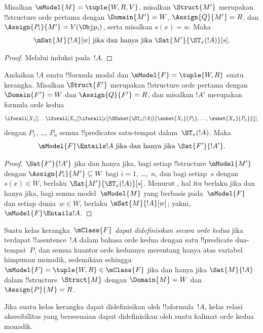 \documentclass[../../../include/open-logic-section]{subfiles}
\begin{document}
\begin{prop}
  Misalkan $\mModel{M}=\tuple{W,R,V}$, misalkan $\Struct{M'}$ merupakan
  !!{structure} orde pertama dengan $\Domain{M'}=W$,
  $\Assign{Q}{M'}=R$, dan $\Assign{P_i}{M'}=V(\Obj p_i)$, serta misalkan
  $s(x)=w$. Maka
  \[
  \mSat{M}{!A}[w] \text{ jika dan hanya jika } \Sat{M'}{\ST_x(!A)}[s].
  \]
\end{prop}

\begin{proof}
  Melalui induksi pada~$!A$.
\end{proof}

\begin{prop}
  Andaikan $!A$ suatu !!{formula} modal dan
  $\mModel{F}=\tuple{W,R}$ suatu kerangka. Misalkan $\Struct{F'}$ merupakan
  !!{structure} orde pertama dengan $\Domain{F'}=W$ dan
  $\Assign{Q}{F'}=R$, dan misalkan $!A'$ merupakan formula orde kedua
  \[
  \lforall[X_1][\dots\lforall[X_n][\lforall[x][
        \SSubst{\ST_x(!A)}{\subst{X_1}{P_1}, \dots,
          \subst{X_n}{P_n}}]]],
  \]
  dengan $P_1$, \dots, $P_n$ semua !!{predicate}s satu-tempat
  dalam~$\ST_x(!A)$. Maka
  \[
  \mModel{F}\Entails !A \text{ jika dan hanya jika } \Sat{F'}{!A'}.
  \]
\end{prop}

\begin{proof}
  $\Sat{F'}{!A'}$ jika dan hanya jika, bagi setiap !!{structure}
  $\mModel{M'}$ dengan $\Assign{P_i}{M'}\subseteq W$ bagi
  $i=1$, \dots,~$n$, dan bagi setiap~$s$ dengan $s(x)\in W$, berlaku
  $\Sat{M'}{\ST_x(!A)}[s]$. Menurut , hal itu berlaku jika
  dan hanya jika, bagi semua model~$\mModel{M}$ yang berbasis
  pada~$\mModel{F}$ dan setiap dunia~$w\in W$, berlaku
  $\mSat{M}{!A}[w]$; yakni, $\mModel{F}\Entails !A$.
\end{proof}

\begin{defn}
  Suatu kelas kerangka~$\mClass{F}$ \emph{dapat didefinisikan secara orde
  kedua} jika terdapat !!a{sentence}~$!A$ dalam bahasa orde kedua dengan satu
  !!{predicate} dua-tempat~$P$, dan semua kuantor orde keduanya merentang hanya
  atas variabel himpunan monadik, sedemikian sehingga
  $\mModel{F}=\tuple{W,R}\in\mClass{F}$ jika dan hanya jika
  $\Sat{M}{!A}$ dalam !!{structure}~$\Struct{M}$ dengan $\Domain{M}=W$ dan
  $\Assign{P}{M}=R$.
\end{defn}

\begin{cor}
  Jika suatu kelas kerangka dapat didefinisikan oleh !!a{formula}~$!A$, kelas
  relasi aksesibilitas yang bersesuaian dapat didefinisikan oleh suatu kalimat
  orde kedua monadik.
\end{cor}
\end{document}

